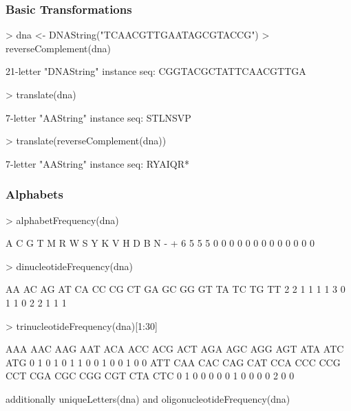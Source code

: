 \documentclass[pdf]{beamer}
\begin{document}
\begin{frame}[fragile]
  \frametitle{Basic Transformations}
  \begin{block}{}
  \begin{footnotesize}
\begin{Schunk}
\begin{Sinput}
> dna <- DNAString("TCAACGTTGAATAGCGTACCG")
> reverseComplement(dna)
\end{Sinput}
\begin{Soutput}
  21-letter "DNAString" instance
seq: CGGTACGCTATTCAACGTTGA
\end{Soutput}
\begin{Sinput}
> translate(dna)
\end{Sinput}
\begin{Soutput}
  7-letter "AAString" instance
seq: STLNSVP
\end{Soutput}
\begin{Sinput}
> translate(reverseComplement(dna))
\end{Sinput}
\begin{Soutput}
  7-letter "AAString" instance
seq: RYAIQR*
\end{Soutput}
\end{Schunk}
  \end{footnotesize}
  \end{block}
\end{frame}


\begin{frame}[fragile]
  \frametitle{Alphabets}
  \begin{block}{}
  \begin{footnotesize}
\begin{Schunk}
\begin{Sinput}
> alphabetFrequency(dna)
\end{Sinput}
\begin{Soutput}
A C G T M R W S Y K V H D B N - + 
6 5 5 5 0 0 0 0 0 0 0 0 0 0 0 0 0 
\end{Soutput}
\begin{Sinput}
> dinucleotideFrequency(dna)
\end{Sinput}
\begin{Soutput}
AA AC AG AT CA CC CG CT GA GC GG GT TA TC TG TT 
 2  2  1  1  1  1  3  0  1  1  0  2  2  1  1  1 
\end{Soutput}
\begin{Sinput}
> trinucleotideFrequency(dna)[1:30]
\end{Sinput}
\begin{Soutput}
AAA AAC AAG AAT ACA ACC ACG ACT AGA AGC AGG AGT ATA ATC ATG 
  0   1   0   1   0   1   1   0   0   1   0   0   1   0   0 
ATT CAA CAC CAG CAT CCA CCC CCG CCT CGA CGC CGG CGT CTA CTC 
  0   1   0   0   0   0   0   1   0   0   0   0   2   0   0 
\end{Soutput}
\end{Schunk}
additionally uniqueLetters(dna) and oligonucleotideFrequency(dna)

  \end{footnotesize}
  \end{block}
\end{frame}
\end{document}
